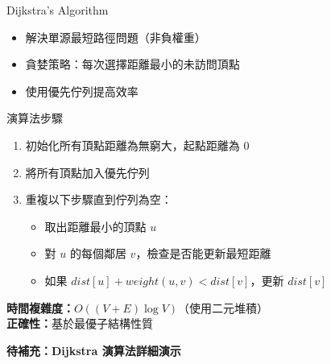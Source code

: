 \documentclass{beamer}
\begin{document}
\begin{frame}{Dijkstra's Algorithm}
\begin{itemize}
    \item 解決單源最短路徑問題（非負權重）
    \item 貪婪策略：每次選擇距離最小的未訪問頂點
    \item 使用優先佇列提高效率
\end{itemize}

\vspace{1em}
\begin{block}{演算法步驟}
\begin{enumerate}
    \item 初始化所有頂點距離為無窮大，起點距離為 0
    \item 將所有頂點加入優先佇列
    \item 重複以下步驟直到佇列為空：
    \begin{itemize}
        \item 取出距離最小的頂點 $u$
        \item 對 $u$ 的每個鄰居 $v$，檢查是否能更新最短距離
        \item 如果 $dist[u] + weight(u,v) < dist[v]$，更新 $dist[v]$
    \end{itemize}
\end{enumerate}
\end{block}

\vspace{1em}
\textbf{時間複雜度：}$O((V + E) \log V)$（使用二元堆積）\\
\textbf{正確性：}基於最優子結構性質

\vspace{1em}
\textbf{待補充：Dijkstra 演算法詳細演示}
\end{frame}
\end{document}
